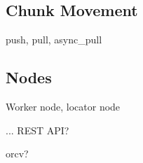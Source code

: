\subsection{Chunk Movement}
push, pull, async\_pull
\subsection{Nodes}
Worker node, locator node

... REST API?


orcv?
